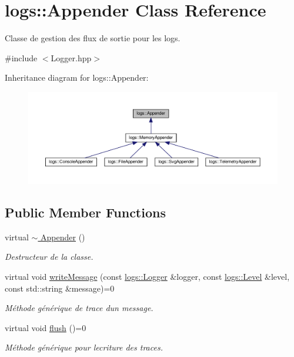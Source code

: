 \hypertarget{classlogs_1_1Appender}{}\section{logs\+:\+:Appender Class Reference}
\label{classlogs_1_1Appender}


Classe de gestion des flux de sortie pour les logs.  




{\ttfamily \#include $<$Logger.\+hpp$>$}



Inheritance diagram for logs\+:\+:Appender\+:
\nopagebreak
\begin{figure}[H]
\begin{center}
\leavevmode
\includegraphics[width=350pt]{classlogs_1_1Appender__inherit__graph}
\end{center}
\end{figure}
\subsection*{Public Member Functions}
\begin{DoxyCompactItemize}
\item 
\mbox{\label{classlogs_1_1Appender_a253afd272c37d4f76c0e26228d7a892f}} 
virtual \hyperlink{classlogs_1_1Appender_a253afd272c37d4f76c0e26228d7a892f}{$\sim$ Appender} ()
\begin{DoxyCompactList}\small\item\em Destructeur de la classe. \end{DoxyCompactList}\item 
virtual void \hyperlink{classlogs_1_1Appender_a940a63ebc17c8e29c1922948903c60e1}{write\+Message} (const \hyperlink{classlogs_1_1Logger}{logs\+::\+Logger} \&logger, const \hyperlink{classlogs_1_1Level}{logs\+::\+Level} \&level, const std\+::string \&message)=0
\begin{DoxyCompactList}\small\item\em Méthode générique de trace d\textquotesingle{}un message. \end{DoxyCompactList}\item 
\mbox{\label{classlogs_1_1Appender_ad682aa0a59e34dc962e4abec5e9b1722}} 
virtual void \hyperlink{classlogs_1_1Appender_ad682aa0a59e34dc962e4abec5e9b1722}{flush} ()=0
\begin{DoxyCompactList}\small\item\em Méthode générique pour l\textquotesingle{}ecriture des traces. \end{DoxyCompactList}\end{DoxyCompactItemize}
